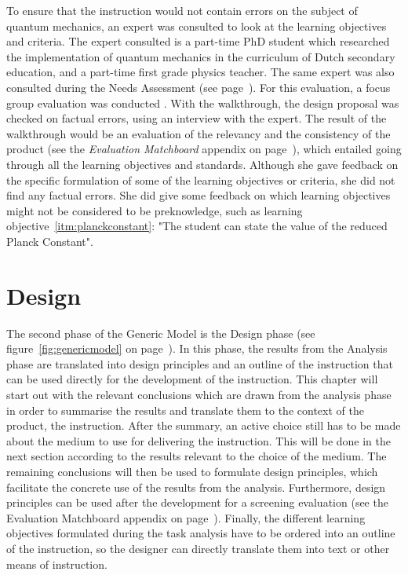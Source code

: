 \documentclass[11pt,twoside]{report} %
\begin{document}
To ensure that the instruction would not contain errors on the subject of quantum mechanics, an expert was consulted to look at the learning objectives and criteria. The expert consulted is a part-time PhD student which researched the implementation of quantum mechanics in the curriculum of Dutch secondary education, and a part-time first grade physics teacher. The same expert was also consulted during the Needs Assessment (see page~\pageref{subsec:problem}). For this evaluation, a focus group evaluation was conducted \cite{evamatchboard}. With the walkthrough, the design proposal was checked on factual errors, using an interview with the expert. The result of the walkthrough would be an evaluation of the relevancy and the consistency of the product (see the \emph{Evaluation Matchboard} appendix on page~\pageref{app:evamatchboard}), which entailed going through all the learning objectives and standards. Although she gave  feedback on the specific formulation of some of the learning objectives or criteria, she did not find any factual errors. She did give some feedback on which learning objectives might not be considered to be preknowledge, such as learning objective~\ref{itm:planckconstant}: "The student can state the value of the reduced Planck Constant".


\part{Design}
\thispagestyle{fancy}

The second phase of the Generic Model is the Design phase \cite{genericmodel} (see figure~\ref{fig:genericmodel} on page~\pageref{fig:genericmodel}). In this phase, the results from the Analysis phase are translated into design principles and an outline of the instruction that can be used directly for the development of the instruction. This chapter will start out with the relevant conclusions which are drawn from the analysis phase in order to summarise the results and translate them to the context of the product, the instruction. After the summary, an active choice still has to be made about the medium to use for delivering the instruction. This will be done in the next section according to the results relevant to the choice of the medium. The remaining conclusions will then be used to formulate design principles, which facilitate the concrete use of the results from the analysis. Furthermore, design principles can be used after the development for a screening evaluation \cite{evamatchboard} (see the Evaluation Matchboard appendix on page~\pageref{app:evamatchboard}). Finally, the different learning objectives formulated during the task analysis have to be ordered into an outline of the instruction, so the designer can directly translate them into text or other means of instruction.
\end{document}
